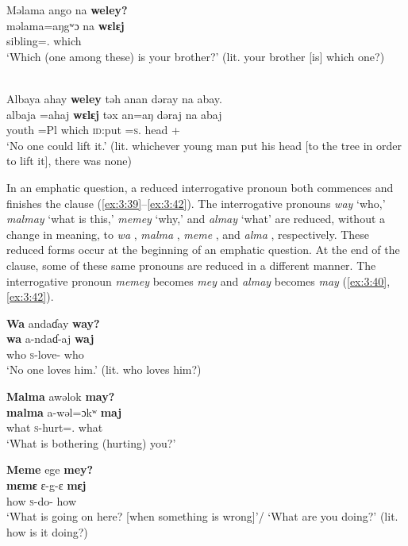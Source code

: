 \ea \label{ex:3:37}
Məlama  ango  na  \textbf{weley?}\\
\gll  məlama=aŋgʷɔ     na   \textbf{wɛlɛj}\\
      sibling={\twoS}.{\POSS}  {\PSP}  which\\
\glt  ‘Which (one among these) is your brother?’ (lit. your brother [is] which one?)
\z


\ea \label{ex:3:38}\\
Albaya  ahay  \textbf{weley} təh  anan  dəray  na  abay.\\
\gll  albaja   =ahaj   \textbf{wɛlɛj}  təx     an=aŋ         dəraj   na  abaj\\
      youth    =Pl    which   \textsc{id}:put   {\DAT}=\textsc{s}.{\IO}   head   {\PSP}   {\EXT}+{\NEG}\\
\glt  ‘No one could lift it.’ (lit. whichever young man put his head [to the tree in order to lift it], there was none)
\z

In an emphatic question, a reduced interrogative pronoun both commences and finishes the clause (\ref{ex:3:39}--\ref{ex:3:42}). The interrogative pronouns \textit{way} ‘who,’ \textit{malmay} ‘what is this,’ \textit{memey} ‘why,’ and \textit{almay} ‘what’ are reduced, without a change in meaning, to \textit{wa} , \textit{malma} , \textit{meme} , and \textit{alma} , respectively. These reduced forms occur at the beginning of an emphatic question. At the end of the clause, some of these same pronouns are reduced in a different manner. The interrogative pronoun \textit{memey} becomes \textit{mey}  and \textit{almay} becomes \textit{may} (\ref{ex:3:40}, \ref{ex:3:42}).

\ea \label{ex:3:39}
\textbf{Wa}  andaɗay  \textbf{way?}\\
\gll  \textbf{wa}    a-ndaɗ-aj   \textbf{waj}\\
      who    \textsc{s}-love-{\CL}  who\\
\glt  ‘No one loves him.’ (lit. who loves him?)
\z

\ea \label{ex:3:40}
\textbf{Malma}  awəlok \textbf{may?}\\
\gll  \textbf{malma}   a-wəl=ɔkʷ   \textbf{maj}\\
      what  \textsc{s}-hurt={\twoS}.{\IO}  what\\
\glt  ‘What is bothering (hurting) you?’
\z

\ea \label{ex:3:41}
\textbf{Meme}  ege  \textbf{mey?}\\
\gll  \textbf{mɛmɛ}   ɛ{}-g-ɛ     \textbf{mɛj}\\
      how    \textsc{s}-do-{\CL}  how\\
\glt  ‘What is going on here? [when something is wrong]’/ ‘What are you doing?’ (lit. how is it doing?)
\z

